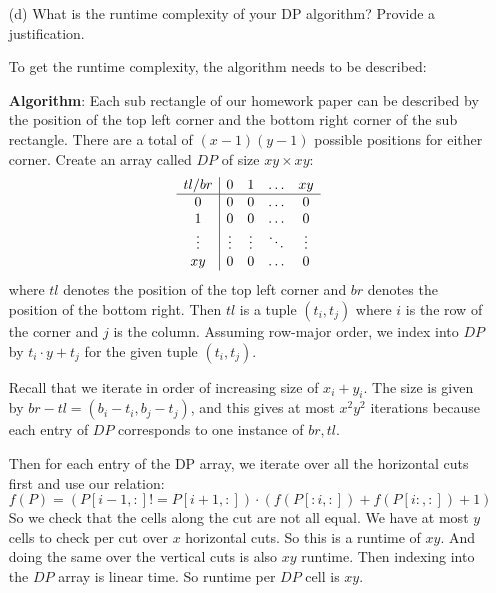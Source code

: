 \documentclass{article}
\begin{document}
\begin{itemize}
        \item [(d)] What is the runtime complexity of your DP algorithm? Provide a justification.
            \begin{answer}
                To get the runtime complexity, the algorithm needs to be described:

                \textbf{Algorithm}: Each sub rectangle of our homework paper can be described by the position of the top left corner and the bottom right corner of the sub rectangle. There are a total of $(x - 1)(y - 1)$ possible positions for either corner. Create an array called $DP$ of size $xy \times xy$:
                    \begin{align*}
                        \begin{array}{ c | c c c c }
                            tl/br  & 0      & 1      & \ldots & xy     \\
                            \hline 0      & 0      & 0      & \ldots & 0      \\
                            1      & 0      & 0      & \ldots & 0      \\
                            \vdots & \vdots & \vdots & \ddots & \vdots \\
                            xy     & 0      & 0      & \ldots & 0        
                        \end{array}
                    \end{align*}
                where $tl$ denotes the position of the top left corner and $br$ denotes the position of the bottom right. Then $tl$ is a tuple $(t_{i}, t_{j})$ where $i$ is the row of the corner and $j$ is the column. Assuming row-major order, we index into $DP$ by $t_{i} \cdot y + t_{j}$ for the given tuple $(t_{i}, t_{j})$. 

                Recall that we iterate in order of increasing size of $x_{i} + y_{i}$. The size is given by $br - tl = (b_{i} - t_{i}, b_{j} - t_{j})$, and this gives at most $x^{2}y^{2}$ iterations because each entry of $DP$ corresponds to one instance of $br, tl$.

                Then for each entry of the DP array, we iterate over all the horizontal cuts first and use our relation:
                    \begin{equation*}
                        f(P) = (P[i-1, :] != P[i+1, :]) \cdot (f(P[:i, :]) + f(P[i:, :]) + 1)
                    \end{equation*}
                So we check that the cells along the cut are not all equal. We have at most $y$ cells to check per cut over $x$ horizontal cuts. So this is a runtime of $xy$. And doing the same over the vertical cuts is also $xy$ runtime. Then indexing into the $DP$ array is linear time. So runtime per $DP$ cell is $xy$.


\end{answer}
\end{itemize}
\end{document}
